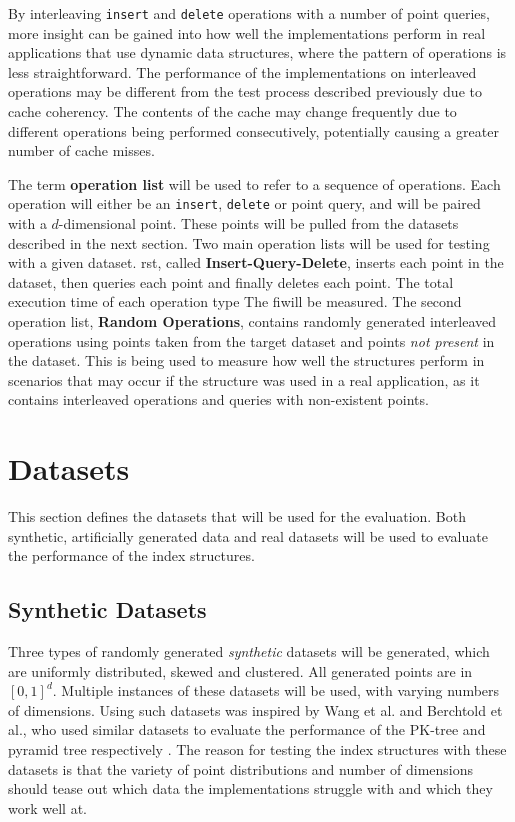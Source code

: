 By interleaving \texttt{insert} and \texttt{delete} operations with a number of point queries, more insight can be gained into how well the implementations perform in real applications that use dynamic data structures, where the pattern of operations is less straightforward. The performance of the implementations on interleaved operations may be different from the test process described previously due to cache coherency. The contents of the cache may change frequently due to different operations being performed consecutively, potentially causing a greater number of cache misses.

The term \textbf{operation list} will be used to refer to a sequence of operations. Each operation will either be an \texttt{insert}, \texttt{delete} or point query, and will be paired with a $d$-dimensional point. These points will be pulled from the datasets described in the next section. Two main operation lists will be used for testing with a given dataset. rst, called \textbf{Insert-Query-Delete}, inserts each point in the dataset, then queries each point and finally deletes each point. The total execution time of each operation type The fiwill be measured. The second operation list, \textbf{Random Operations}, contains randomly generated interleaved operations using points taken from the target dataset and points \textit{not present} in the dataset. This is being used to measure how well the structures perform in scenarios that may occur if the structure was used in a real application, as it contains interleaved operations and queries with non-existent points.

\section{Datasets}
\label{sec:datasets}

This section defines the datasets that will be used for the evaluation. Both synthetic, artificially generated data and real datasets will be used to evaluate the performance of the index structures.

\subsection{Synthetic Datasets}

 Three types of randomly generated \textit{synthetic} datasets will be generated, which are uniformly distributed, skewed and clustered. All generated points are in $[0,1]^d$. Multiple instances of these datasets will be used, with varying numbers of dimensions. Using such datasets was inspired by Wang et al. and Berchtold et al., who used similar datasets to evaluate the performance of the PK-tree and pyramid tree respectively \cite{pk-tree, pyramid-tree}. The reason for testing the index structures with these datasets is that the variety of point distributions and number of dimensions should tease out which data the implementations struggle with and which they work well at.

